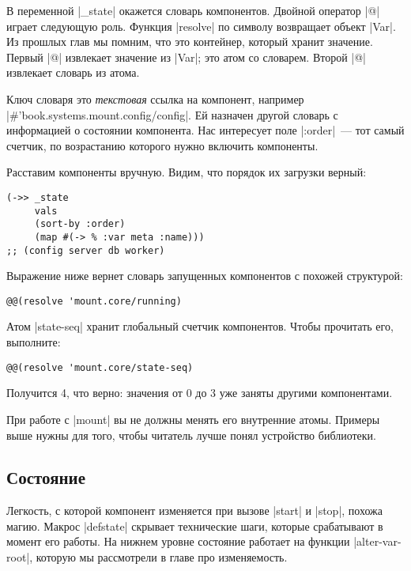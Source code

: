 В переменной \spverb|_state| окажется словарь компонентов. Двойной оператор
\spverb|@| играет следующую роль. Функция \spverb|resolve| по символу возвращает
объект \spverb|Var|. Из прошлых глав мы помним, что это контейнер, который
хранит значение. Первый \spverb|@| извлекает значение из \spverb|Var|; это атом
со словарем. Второй \spverb|@| извлекает словарь из атома.

Ключ словаря это \emph{текстовая} ссылка на компонент, например
\spverb|#'book.systems.mount.config/config|. Ей назначен другой словарь с
информацией о состоянии компонента. Нас интересует поле \spverb|:order|~--- тот
самый счетчик, по возрастанию которого нужно включить компоненты.

Расставим компоненты вручную. Видим, что порядок их загрузки верный:

\begin{verbatim}
(->> _state
     vals
     (sort-by :order)
     (map #(-> % :var meta :name)))
;; (config server db worker)
\end{verbatim}

Выражение ниже вернет словарь запущенных компонентов с похожей структурой:

\begin{verbatim}
@@(resolve 'mount.core/running)
\end{verbatim}

Атом \spverb|state-seq| хранит глобальный счетчик компонентов. Чтобы прочитать
его, выполните:

\begin{verbatim}
@@(resolve 'mount.core/state-seq)
\end{verbatim}

Получится 4, что верно: значения от 0 до 3 уже заняты другими компонентами.

При работе с \spverb|mount| вы не должны менять его внутренние атомы. Примеры
выше нужны для того, чтобы читатель лучше понял устройство библиотеки.

\subsection{Состояние}

Легкость, с которой компонент изменяется при вызове \spverb|start| и
\spverb|stop|, похожа магию. Макрос \spverb|defstate| скрывает технические шаги,
которые срабатывают в момент его работы. На нижнем уровне состояние работает на
функции \spverb|alter-var-root|, которую мы рассмотрели в главе про
изменяемость.

